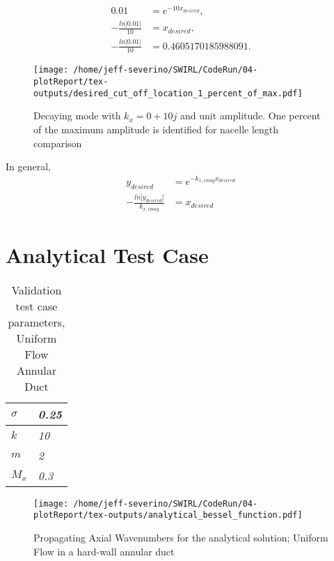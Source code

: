 \documentclass[a4paper]{report}
\begin{document}
\begin{align*}
    0.01 &=  e^{-10 x_{desired}},\\
    -\frac{ln|0.01|}{10} &=  x_{desired},\\
    -\frac{ln|0.01|}{10} &= 0.4605170185988091 .
\end{align*}


 \begin{figure}
     \centering
     \texttt{[image: /home/jeff-severino/SWIRL/CodeRun/04-plotReport/tex-outputs/desired\_cut\_off\_location\_1\_percent\_of\_max.pdf]}
     \caption{Decaying mode with $k_x = 0 + 10j$ and unit amplitude. One percent
     of the maximum amplitude is identified for nacelle length comparison}
     \label{fig:decaying_mode_with_1_percent_amp}
 \end{figure}
 
 
In general,
\begin{align*}
    y_{desired} &=  e^{-k_{x,imag} x_{desired} }\\
    -\frac{ln|y_{desired}|}{k_{x,imag}} &=  x_{desired}
\end{align*}
\section{Analytical Test Case}
\begin{table}[h!]
    \centering
    \begin{tabular}{|l|l|}
        \hline
        $\sigma$ & \textit{0.25} \\ \hline
        $k$      & \textit{10}   \\ \hline
        $m$      & \textit{2}    \\ \hline
        $M_x$    & \textit{0.3}  \\ \hline
    \end{tabular}
    \caption{Validation test case parameters, Uniform Flow Annular Duct} 
\end{table}


 \begin{figure}
     \centering
     \texttt{[image: /home/jeff-severino/SWIRL/CodeRun/04-plotReport/tex-outputs/analytical\_bessel\_function.pdf]}
     \caption{Propagating Axial Wavenumbers for the analytical solution; Uniform
     Flow in a hard-wall annular duct}
     \label{fig:analytical_bessel_function}
 \end{figure}
\end{document}
